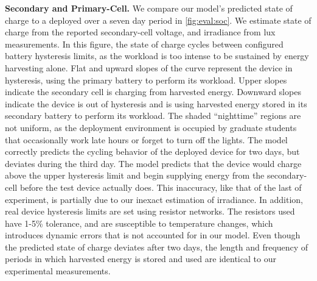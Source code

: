 \vspace{-6pt}
\noindent
\textbf{Secondary and Primary-Cell.}
We compare our model's predicted state of charge to a deployed \name over a seven
day period in \cref{fig:eval:soc}. We estimate state of charge from the reported secondary-cell
voltage,
and irradiance from
lux measurements. In this figure, the state of
charge cycles between configured battery hysteresis limits, as the workload is
too intense to be sustained by energy harvesting alone.
Flat and upward slopes of the curve represent the
device in hysteresis, using the primary battery to perform its workload. Upper slopes
indicate the secondary cell is charging from harvested energy.
Downward slopes indicate the device is out of hysteresis and is using harvested
energy stored in its secondary battery to perform its workload.
The shaded ``nighttime'' regions are not uniform, as the
deployment environment is occupied by graduate students that occasionally work
late hours or forget to turn off the lights.  The model correctly predicts the
cycling
behavior of the deployed device for two days, but deviates
during the third day. The model predicts that the device would charge above the upper
hysteresis limit and begin supplying energy from the secondary-cell before the
test device actually does.  This inaccuracy, like that of the last of
experiment, is partially due to our inexact estimation of irradiance.  In
addition, real device hysteresis limits are set using resistor networks.  The
resistors used have 1-5\% tolerance, and are susceptible to temperature
changes, which introduces dynamic errors that is not accounted for in our model.
Even though the predicted state of charge deviates after two days, the length
and frequency of periods in which harvested energy is stored and used %
are identical to our experimental measurements.
